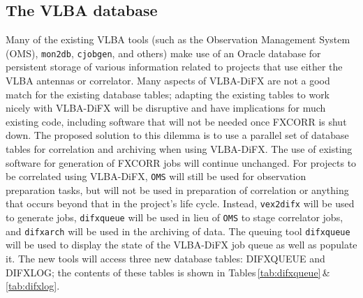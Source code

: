 \subsection{The VLBA database}

Many of the existing VLBA tools (such as the Observation Management System (OMS), {\tt mon2db}, {\tt cjobgen}, and others) make use of an Oracle database for persistent storage of various information related to projects that use either the VLBA antennas or correlator.
Many aspects of VLBA-DiFX are not a good match for the existing database tables; adapting the existing tables to work nicely with VLBA-DiFX will be disruptive and have implications for much existing code, including software that will not be needed once FXCORR is shut down.
The proposed solution to this dilemma is to use a parallel set of database tables for correlation and archiving when using VLBA-DiFX.
The use of existing software for generation of FXCORR jobs will continue unchanged.
For projects to be correlated using VLBA-DiFX, {\tt OMS} will still be used for observation preparation tasks, but will not be used in preparation of correlation or anything that occurs beyond that in the project's life cycle.  Instead, {\tt vex2difx} will be used to generate jobs, {\tt difxqueue} will be used in lieu of {\tt OMS} to stage correlator jobs, and {\tt difxarch} will be used in the archiving of data.
The queuing tool {\tt difxqueue} will be used to display the state of the VLBA-DiFX job queue as well as populate it.
The new tools will access three new database tables: DIFXQUEUE and DIFXLOG; the contents of these tables is shown in Tables\,\ref{tab:difxqueue}\,\&\,\ref{tab:difxlog}.


